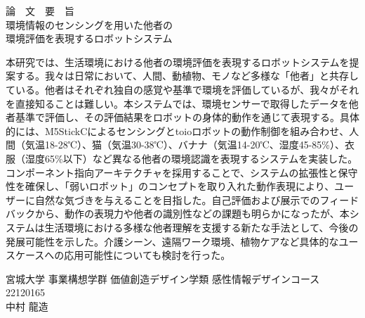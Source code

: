 \begin{center}
  {\Large
    論　文　要　旨\\
    \vspace{2\zh}
    環境情報のセンシングを用いた他者の\\環境評価を表現するロボットシステム\\
    \vspace{2\zh}
  }
\end{center}

本研究では、生活環境における他者の環境評価を表現するロボットシステムを提案する。我々は日常において、人間、動植物、モノなど多様な「他者」と共存している。他者はそれぞれ独自の感覚や基準で環境を評価しているが、我々がそれを直接知ることは難しい。本システムでは、環境センサーで取得したデータを他者基準で評価し、その評価結果をロボットの身体的動作を通じて表現する。具体的には、M5StickCによるセンシングとtoioロボットの動作制御を組み合わせ、人間（気温18-28℃）、猫（気温30-38℃）、バナナ（気温14-20℃、湿度45-85\%）、衣服（湿度65\%以下）など異なる他者の環境認識を表現するシステムを実装した。コンポーネント指向アーキテクチャを採用することで、システムの拡張性と保守性を確保し、「弱いロボット」のコンセプトを取り入れた動作表現により、ユーザーに自然な気づきを与えることを目指した。自己評価および展示でのフィードバックから、動作の表現力や他者の識別性などの課題も明らかになったが、本システムは生活環境における多様な他者理解を支援する新たな手法として、今後の発展可能性を示した。介護シーン、遠隔ワーク環境、植物ケアなど具体的なユースケースへの応用可能性についても検討を行った。

\vspace{3\zh}

\begin{flushright}
  宮城大学 事業構想学群 価値創造デザイン学類 感性情報デザインコース\\
  22120165\\ %
  中村 龍造\\ %
\end{flushright}
